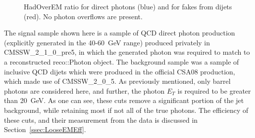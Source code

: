 \documentclass{cmspaper}
\begin{document}
\begin{figure}[hbtp]
  \begin{center}
    \caption{HadOverEM ratio for direct photons (blue) and for fakes from dijets (red).  No photon overflows are present.}
    \label{fig:HadOverEM_EMLoose}
  \end{center}
\end{figure}

The signal sample shown here is a sample of QCD direct photon production (explicitly generated in the 40-60~GeV range) produced privately in CMSSW\_2\_1\_0\_pre5, in which the generated photon was required to match to a reconstructed reco::Photon object.  The background sample was a sample of inclusive QCD dijets which were produced in the official CSA08 production, which made use of CMSSW\_2\_0\_5.  As previously mentioned, only barrel photons are considered here, and further, the photon $E_{T}$ is required to be greater than 20~GeV.
As one can see, these cuts remove a significant portion of the jet background, while retaining most if not all of the true photons.  The efficiency of these cuts, and their measurement from the data is discussed in Section~\ref{ssec:LooseEMEff}.
\end{document}
